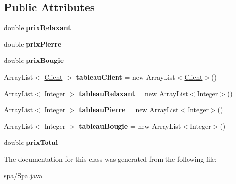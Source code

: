 \subsection*{Public Attributes}
\begin{DoxyCompactItemize}
\item 
double {\bfseries prix\+Relaxant}\hypertarget{classspa_1_1_spa_af86eb1c2f9e318fcf2c9504110cb92fc}{}\label{classspa_1_1_spa_af86eb1c2f9e318fcf2c9504110cb92fc}

\item 
double {\bfseries prix\+Pierre}\hypertarget{classspa_1_1_spa_aff1c72b1b06f958361de4ea27bbc0f08}{}\label{classspa_1_1_spa_aff1c72b1b06f958361de4ea27bbc0f08}

\item 
double {\bfseries prix\+Bougie}\hypertarget{classspa_1_1_spa_a289f7878a8cf0010098bc18b69dbdf00}{}\label{classspa_1_1_spa_a289f7878a8cf0010098bc18b69dbdf00}

\item 
Array\+List$<$ \hyperlink{classclient_1_1_client}{Client} $>$ {\bfseries tableau\+Client} = new Array\+List$<$\hyperlink{classclient_1_1_client}{Client}$>$()\hypertarget{classspa_1_1_spa_af081f234e3013c472766870ecc5eda54}{}\label{classspa_1_1_spa_af081f234e3013c472766870ecc5eda54}

\item 
Array\+List$<$ Integer $>$ {\bfseries tableau\+Relaxant} = new Array\+List$<$Integer$>$()\hypertarget{classspa_1_1_spa_a51d4dd0f55b2204b453aff717d36f890}{}\label{classspa_1_1_spa_a51d4dd0f55b2204b453aff717d36f890}

\item 
Array\+List$<$ Integer $>$ {\bfseries tableau\+Pierre} = new Array\+List$<$Integer$>$()\hypertarget{classspa_1_1_spa_a8efb784331cac4c3ad58a526fbebd551}{}\label{classspa_1_1_spa_a8efb784331cac4c3ad58a526fbebd551}

\item 
Array\+List$<$ Integer $>$ {\bfseries tableau\+Bougie} = new Array\+List$<$Integer$>$()\hypertarget{classspa_1_1_spa_a02d800bc0b185c7241ed4f0cbd573a43}{}\label{classspa_1_1_spa_a02d800bc0b185c7241ed4f0cbd573a43}

\item 
double {\bfseries prix\+Total}\hypertarget{classspa_1_1_spa_a67945f1ee7790c435c6f8db646b2e850}{}\label{classspa_1_1_spa_a67945f1ee7790c435c6f8db646b2e850}

\end{DoxyCompactItemize}


The documentation for this class was generated from the following file\+:\begin{DoxyCompactItemize}
\item 
spa/Spa.\+java\end{DoxyCompactItemize}
